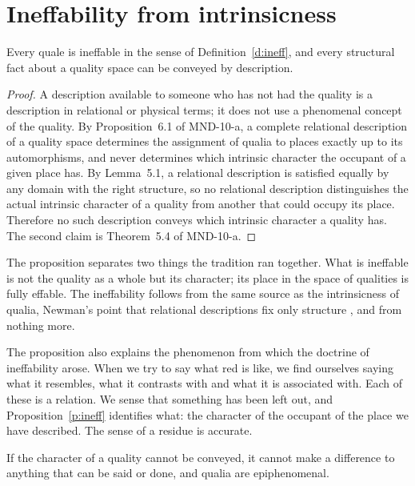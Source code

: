 \documentclass{situationist-preprint}
\begin{document}
\section{Ineffability from intrinsicness}

\begin{proposition}\label{p:ineff}
Every quale is ineffable in the sense of Definition~\ref{d:ineff}, and every structural fact about a quality space can be conveyed by description.
\end{proposition}

\begin{proof}
A description available to someone who has not had the quality is a description in relational or physical terms; it does not use a phenomenal concept of the quality. By Proposition~6.1 of MND-10-a, a complete relational description of a quality space determines the assignment of qualia to places exactly up to its automorphisms, and never determines which intrinsic character the occupant of a given place has. By Lemma~5.1, a relational description is satisfied equally by any domain with the right structure, so no relational description distinguishes the actual intrinsic character of a quality from another that could occupy its place. Therefore no such description conveys which intrinsic character a quality has. The second claim is Theorem~5.4 of MND-10-a.
\end{proof}

The proposition separates two things the tradition ran together. What is ineffable is not the quality as a whole but its character; its place in the space of qualities is fully effable. The ineffability follows from the same source as the intrinsicness of qualia, Newman's point that relational descriptions fix only structure \citep{Newman1928}, and from nothing more.

The proposition also explains the phenomenon from which the doctrine of ineffability arose. When we try to say what red is like, we find ourselves saying what it resembles, what it contrasts with and what it is associated with. Each of these is a relation. We sense that something has been left out, and Proposition~\ref{p:ineff} identifies what: the character of the occupant of the place we have described. The sense of a residue is accurate.

\begin{objection}
If the character of a quality cannot be conveyed, it cannot make a difference to anything that can be said or done, and qualia are epiphenomenal.
\end{objection}
\end{document}
